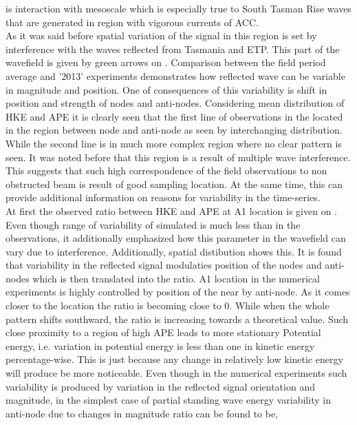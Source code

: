 \documentclass[12pt]{article}
\begin{document}
is interaction with mesoscale which is especially true to South Tasman Rise waves that are 
generated in region with vigorous currents of ACC.\\
As it was said before spatial variation of the signal in this region is set by interference with 
the waves reflected from Tasmania and ETP. This part of the wavefield is given by green arrows on 
. Comparison between the field period average and '2013' experiments 
demonstrates how reflected wave can be variable in magnitude and position. One of consequences of 
this variability is shift in position and strength of nodes and anti-nodes. Considering mean 
distribution of HKE and APE  it is clearly seen that the first 
line of observations in the located in the region between node and anti-node as seen by 
interchanging distribution. While the second line is in much more complex region where no clear 
pattern is seen. It was noted before that this region is a result of multiple wave interference. 
This suggests that such high correspondence of the field observations to non obstructed beam is 
result of good sampling location. At the same time, this can provide additional information on 
reasons for variability in the time-series.\\
At first the observed ratio between HKE and APE at A1 location is given on 
. Even though range of variability of simulated is much less 
than in the observations, it additionally emphasized how this parameter in the wavefield can vary 
due to interference. Additionally, spatial distibution shows this. It is found that variability in 
the reflected signal modulaties position of the nodes and anti-nodes which is then translated into 
the ratio. A1 location in the numerical experiments is highly controlled by position of the near by 
anti-node. As it comes closer to the location the ratio is becoming close to 0. While when the 
whole pattern shifts southward, the ratio is increasing towards a theoretical value. Such close 
proximity to a region of high APE leads to more stationary Potential energy, i.e. variation in 
potential energy is less than one in kinetic energy percentage-wise. This is just because any 
change in relatively low kinetic energy will produce be more noticeable. Even though in the 
numerical experiments such variability is produced by variation in the reflected signal orientation 
and magnitude, in the simplest case of partial standing wave energy variability in anti-node due to 
changes in magnitude ratio can be found to be,
\end{document}
